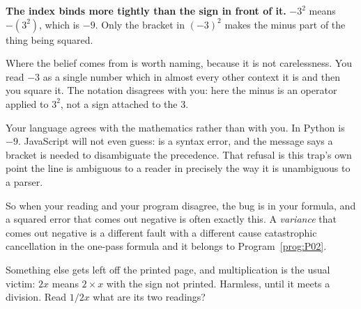 \begin{fr}
\begin{trapbox}
\textbf{The index binds more tightly than the sign in front of it.} $-3^{2}$
means $-(3^{2})$, which is $-9$. Only the bracket in $(-3)^{2}$ makes the minus
part of the thing being squared.

Where the belief comes from is worth naming, because it is not carelessness.
You read $-3$ as a single number \dash{} which in almost every other context it
is \dash{} and then you square it. The notation disagrees with you: here the
minus is an operator applied to $3^{2}$, not a sign attached to the $3$.

Your language agrees with the mathematics rather than with you. In Python
 is $-9$. JavaScript will not even guess:  is a
syntax error, and the message says a bracket is needed to disambiguate the
precedence. That refusal is this trap's own point \dash{} the line is ambiguous
to a reader in precisely the way it is unambiguous to a parser.

So when your reading and your program disagree, the bug is in your formula, and
a squared error that comes out negative is often exactly this. A
\emph{variance} that comes out negative is a different fault with a different
cause \dash{} catastrophic cancellation in the one-pass formula \dash{} and it
belongs to Program~\ref{prog:P02}.
\end{trapbox}
Something else gets left off the printed page, and multiplication is the usual
victim: $2x$ means $2 \times x$ with the sign not printed. Harmless, until it
meets a division. Read $1/2x$ \dash{} what are its two readings?
\nextframe
\end{fr}

